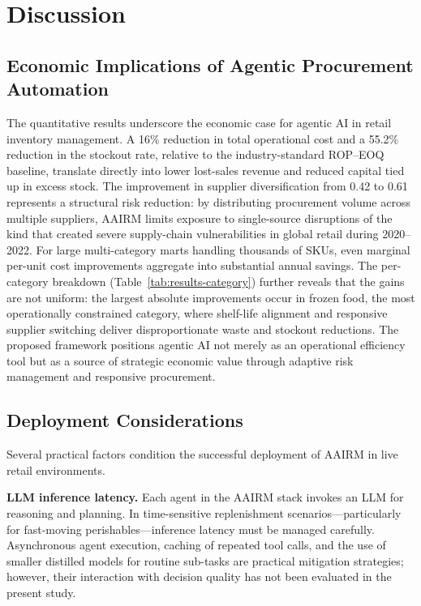 \documentclass[utf8]{FrontiersinHarvard}
\begin{document}
	\section{Discussion}
	\label{sec:discussion}

	\subsection{Economic Implications of Agentic Procurement Automation}

	The quantitative results underscore the economic case for agentic AI in
	retail inventory management.  A 16\% reduction in total operational cost
	and a 55.2\% reduction in the stockout rate, relative to the
	industry-standard ROP--EOQ baseline, translate directly into lower
	lost-sales revenue and reduced capital tied up in excess stock.  The
	improvement in supplier diversification from 0.42 to 0.61 represents a
	structural risk reduction: by distributing procurement volume across
	multiple suppliers, AAIRM limits exposure to single-source disruptions of
	the kind that created severe supply-chain vulnerabilities in global retail
	during 2020--2022.  For large multi-category marts handling thousands of
	SKUs, even marginal per-unit cost improvements aggregate into substantial
	annual savings.  The per-category breakdown (Table~\ref{tab:results-category})
	further reveals that the gains are not uniform: the largest absolute
	improvements occur in frozen food, the most operationally constrained
	category, where shelf-life alignment and responsive supplier switching
	deliver disproportionate waste and stockout reductions.  The proposed
	framework positions agentic AI not merely as an operational efficiency
	tool but as a source of strategic economic value through adaptive risk
	management and responsive procurement.

	\subsection{Deployment Considerations}

	Several practical factors condition the successful deployment of AAIRM
	in live retail environments.

	\textbf{LLM inference latency.}  Each agent in the AAIRM stack invokes an
	LLM for reasoning and planning.  In time-sensitive replenishment
	scenarios---particularly for fast-moving perishables---inference latency
	must be managed carefully.  Asynchronous agent execution, caching of
	repeated tool calls, and the use of smaller distilled models for routine
	sub-tasks are practical mitigation strategies; however, their interaction
	with decision quality has not been evaluated in the present study.
\end{document}
